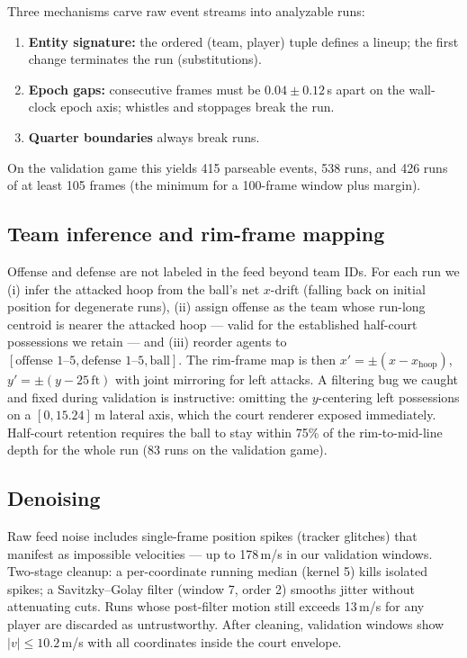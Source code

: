 \documentclass[11pt]{article}
\begin{document}
Three mechanisms carve raw event streams into analyzable runs:
\begin{enumerate}[leftmargin=*,itemsep=1pt]
\item \textbf{Entity signature:} the ordered (team, player) tuple defines a
  lineup; the first change terminates the run (substitutions).
\item \textbf{Epoch gaps:} consecutive frames must be $0.04 \pm 0.12$\,s apart
  on the wall-clock epoch axis; whistles and stoppages break the run.
\item \textbf{Quarter boundaries} always break runs.
\end{enumerate}
On the validation game this yields 415 parseable events, 538 runs, and 426
runs of at least 105 frames (the minimum for a 100-frame window plus margin).

\subsection{Team inference and rim-frame mapping}
\label{sec:frame}

Offense and defense are not labeled in the feed beyond team IDs. For each run
we (i) infer the attacked hoop from the ball's net $x$-drift (falling back on
initial position for degenerate runs), (ii) assign offense as the team whose
run-long centroid is nearer the attacked hoop --- valid for the established
half-court possessions we retain --- and (iii) reorder agents to
$[\text{offense 1--5}, \text{defense 1--5}, \text{ball}]$. The rim-frame map
is then $x' = \pm(x - x_{\text{hoop}})$, $y' = \pm(y - 25\,\text{ft})$ with
joint mirroring for left attacks. A filtering bug we caught and fixed during
validation is instructive: omitting the $y$-centering left possessions on a
$[0, 15.24]$\,m lateral axis, which the court renderer exposed immediately.
Half-court retention requires the ball to stay within 75\% of the rim-to-mid-line
depth for the whole run (83 runs on the validation game).

\subsection{Denoising}
\label{sec:denoise}

Raw feed noise includes single-frame position spikes (tracker glitches) that
manifest as impossible velocities --- up to 178\,m/s in our validation
windows. Two-stage cleanup: a per-coordinate running median (kernel 5) kills
isolated spikes; a Savitzky--Golay filter (window 7, order 2) smooths jitter
without attenuating cuts. Runs whose post-filter motion still exceeds
13\,m/s for any player are discarded as untrustworthy. After cleaning,
validation windows show $|v| \le 10.2$\,m/s with all coordinates inside the
court envelope.
\end{document}
